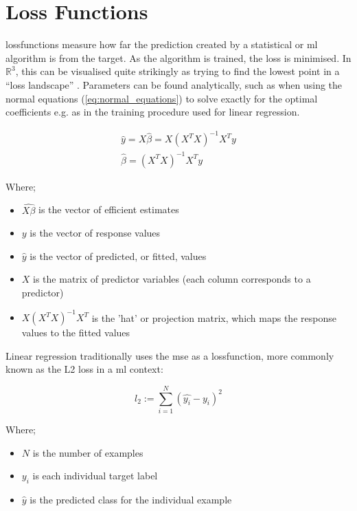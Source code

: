 \section{Loss Functions}

\Gls{lossfunction}s measure how far the prediction created by a statistical or \gls{ml} algorithm is from the target. As the algorithm is trained, the loss is minimised. In $\mathds{R}^3$, this can be visualised quite strikingly as trying to find the lowest point in a \enquote{loss landscape} \cite{loss_landscape}. Parameters can be found analytically, such as when using the normal equations (\ref{eq:normal_equations}) to solve exactly for the optimal coefficients e.g. as in the training procedure used for linear regression.
\bigskip

\begin{align}
    \hat{y} = X\hat{\beta} = X(X^TX)^{-1}X^Ty \\
    \hat{\beta} = (X^TX)^{-1}X^Ty
    \label{eq:normal_equations}
\end{align}

Where;

\begin{itemize}
    \item $\hat{X\beta}$ is the vector of efficient estimates
    \item $y$ is the vector of response values  
    \item $\hat{y}$ is the vector of predicted, or fitted, values  
    \item $X$ is the matrix of predictor variables (each column corresponds to a predictor)
    \item $X(X^TX)^{-1}X^T$ is the 'hat' or projection matrix, which maps the response values to the fitted values
\end{itemize}

Linear regression traditionally uses the  \gls{mse} as a \gls{lossfunction}, more commonly known as the L2 loss in a \gls{ml} context:

\begin{equation}
l_2 := \sum_{i = 1}^N (\hat{y_i} - y_i)^2
\end{equation}

Where;

\begin{itemize}
    \item $N$ is the number of examples  
    \item $y_i$ is each individual target label  
    \item $\hat{y}$ is the predicted class for the individual example 
\end{itemize}

